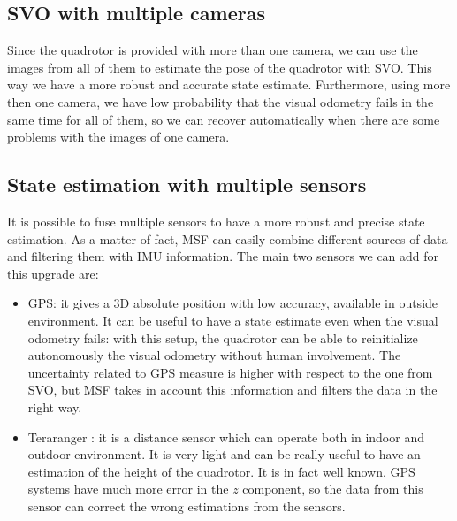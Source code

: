 \subsection{SVO with multiple cameras}
Since the quadrotor is provided with more than one camera, we can use the images from all of them to estimate the pose of the quadrotor with SVO. This way we have a more robust and accurate state estimate. Furthermore, using more then one camera, we have low probability that  the visual odometry fails in the same time for all of them, so we can recover automatically when there are some problems with the images of one camera.

\subsection{State estimation with multiple sensors}
It is possible to fuse multiple sensors to have a more robust and precise state estimation. As a matter of fact, MSF can easily combine different sources of data and filtering them with IMU information.
The main two sensors we can add for this upgrade are:
\begin{itemize}
\item GPS: it gives a 3D absolute position with low accuracy, available in outside environment. It can be useful to have a state estimate even when the visual odometry fails: with this setup, the quadrotor can be able to reinitialize autonomously the visual odometry without human involvement. The uncertainty related to GPS measure is higher with respect to the one from SVO, but MSF takes in account this information and filters the data in the right way.
\item Teraranger \cite{teraranger}: it is a distance sensor which can operate both in indoor and outdoor environment. It is very light and can be really useful to have an estimation of the height of the quadrotor. It is in fact well known, GPS systems have much more error in the $z$ component, so the data from this sensor can correct the wrong estimations from the sensors. 
\end{itemize}

